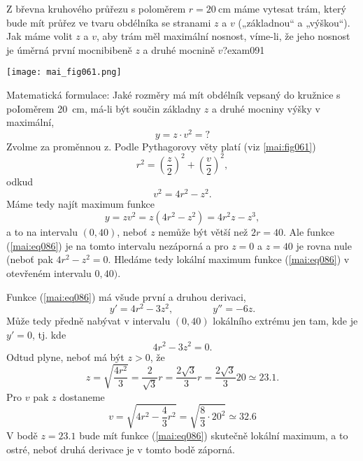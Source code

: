 \begin{mathexam}{Z břevna kruhového průřezu s poloměrem \(r = \qty{20}{\cm}\) máme vytesat trám,
  který bude mít průřez ve tvaru obdélníka se stranami \(z\) a \(v\) („základnou“ a „výškou“). Jak
  máme volit \(z\) a \(v\), aby trám měl maximální nosnost, víme-li, že jeho nosnost je úměrná první
  mocnibibeně \(z\) a druhé mocnině \(v\)?}{exam091}
   
  {\centering
    \captionsetup{type=figure}
    \texttt{[image: mai\_fig061.png]} 
    \label{mai:fig061}
  \par}
  
  Matematická formulace: Jaké rozměry má mít obdélník vepsaný do kružnice s poIoměrem \qty{20}{\cm},
  má-li být součin základny \(z\) a druhé mocniny výšky v maximální,
  \begin{equation*}
    y = z\cdot v^2 = ?
  \end{equation*}
  Zvolme za proměnnou z. Podle Pythagorovy věty platí (viz \ref{mai:fig061})
  \begin{equation*}
      r^2 = \left(\dfrac{z}{2}\right)^2 + \left(\dfrac{v}{2}\right)^2,
  \end{equation*}
  odkud 
  \begin{equation*}
      v^2 = 4r^2 - z^2.
  \end{equation*}
  Máme tedy najít maximum funkce
  \begin{equation}\label{mai:eq086}
      y = zv^2 = z(4r^2 - z^2) = 4r^2z - z^3,
  \end{equation}
  a to na intervalu \((0,40)\), neboť \(z\) nemůže být větší než \(2r = 40\). Ale funkce
  (\ref{mai:eq086}) je na tomto intervalu nezáporná a pro \(z = 0\) a \(z = 40\) je rovna nule
  (neboť pak \(4r^2 - z^2 = 0\). Hledáme tedy lokální maximum funkce (\ref{mai:eq086}) v otevřeném
  intervalu \(0,40)\). 

  Funkce (\ref{mai:eq086}) má všude první a druhou derivaci,
  \begin{equation*}
      y' = 4r^2 - 3z^2, \qquad\qquad y'' = -6z.
  \end{equation*}
  Může tedy předně nabývat v intervalu \((0, 40)\) lokálního extrému jen tam, kde je \(y'=0\), tj.
  kde
  \begin{equation*}
      4r^2 - 3z^2 = 0.
  \end{equation*}
  Odtud plyne, neboť má být \(z > 0\), že
  \begin{equation*}
      z = \sqrt{\dfrac{4r^2}{3}} = \dfrac{2}{\sqrt{3}}r = \dfrac{2\sqrt{3}}{3}r = 
          \dfrac{2\sqrt{3}}{3}20 \simeq \num{23.1}.
  \end{equation*}
  Pro \(v\) pak \(z\) dostaneme
  \begin{equation*}
      v = \sqrt{4r^2 - \dfrac{4}{3}r^2} = \sqrt{\frac{8}{3}\cdot20^2}\simeq\num{32.6}
  \end{equation*}
  V bodě \(z = \num{23.1}\) bude mít funkce (\ref{mai:eq086}) skutečně lokální maximum, a to ostré,
  neboť druhá derivace je v tomto bodě záporná.
\end{mathexam}